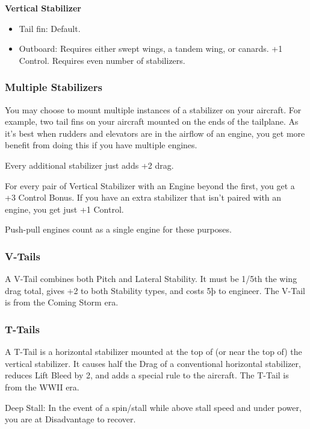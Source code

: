 \documentclass{article}
\begin{document}
\textbf{Vertical Stabilizer}

\begin{itemize}
  \item          Tail fin: Default.
  \item          Outboard: Requires either swept wings, a tandem wing, or
        canards. +1 Control. Requires even number of stabilizers.
\end{itemize}

\subsubsection{Multiple Stabilizers}
\label{_Multiple Stabilizers}

You may choose to mount multiple instances of a stabilizer on your
aircraft. For example, two tail fins on your aircraft mounted on the
ends of the tailplane. As it's best when rudders and elevators are in
the airflow of an engine, you get more benefit from doing this if you
have multiple engines.

Every additional stabilizer just adds +2 drag.

For every pair of Vertical Stabilizer with an Engine beyond the first,
you get a +3 Control Bonus. If you have an extra stabilizer that isn't
paired with an engine, you get just +1 Control.

Push-pull engines count as a single engine for these purposes.

\subsubsection{V-Tails}
\label{_V-Tails}

A V-Tail combines both Pitch and Lateral Stability. It must be 1/5th the
wing drag total, gives +2 to both Stability types, and costs 5þ to
engineer. The V-Tail is from the Coming Storm era.

\subsubsection{T-Tails}
\label{_T-Tails}

A T-Tail is a horizontal stabilizer mounted at the top of (or near the
top of) the vertical stabilizer. It causes half the Drag of a
conventional horizontal stabilizer, reduces Lift Bleed by 2, and adds a
special rule to the aircraft. The T-Tail is from the WWII era.

Deep Stall: In the event of a spin/stall while above stall speed and
under power, you are at Disadvantage to recover.
\end{document}
